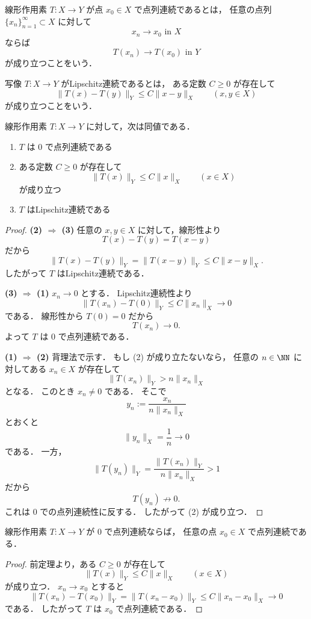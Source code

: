 \begin{definition}[点列連続]
線形作用素 $T:X\to Y$ が点 $x_0\in X$ で点列連続であるとは，
任意の点列 $\{x_n\}_{n=1}^{\infty}\subset X$ に対して
\[
x_n\to x_0 \text{ in } X
\]
ならば
\[
T(x_n)\to T(x_0) \text{ in } Y
\]
が成り立つことをいう．
\end{definition}

\begin{definition}[Lipschitz連続]
写像 $T:X\to Y$ がLipschitz連続であるとは，
ある定数 $C\ge 0$ が存在して
\[
\|T(x)-T(y)\|_Y\le C\|x-y\|_X
\qquad (x,y\in X)
\]
が成り立つことをいう．
\end{definition}

\begin{theorem}[線形作用素の連続性の判定]
線形作用素 $T:X\to Y$ に対して，次は同値である．
\begin{enumerate}
    \item $T$ は $0$ で点列連続である
    \item ある定数 $C\ge 0$ が存在して
    \[
    \|T(x)\|_Y\le C\|x\|_X
    \qquad (x\in X)
    \]
    が成り立つ
    \item $T$ はLipschitz連続である
\end{enumerate}
\end{theorem}
\begin{proof}
\textbf{(2) $\Rightarrow$ (3)}\quad
任意の $x,y\in X$ に対して，線形性より
\[
T(x)-T(y)=T(x-y)
\]
だから
\[
\|T(x)-T(y)\|_Y
=
\|T(x-y)\|_Y
\le
C\|x-y\|_X.
\]
したがって $T$ はLipschitz連続である．

\textbf{(3) $\Rightarrow$ (1)}\quad
$x_n\to 0$ とする．
Lipschitz連続性より
\[
\|T(x_n)-T(0)\|_Y\le C\|x_n\|_X\to 0
\]
である．
線形性から $T(0)=0$ だから
\[
T(x_n)\to 0.
\]
よって $T$ は $0$ で点列連続である．

\textbf{(1) $\Rightarrow$ (2)}\quad
背理法で示す．
もし (2) が成り立たないなら，
任意の $n\in\NN$ に対してある $x_n\in X$ が存在して
\[
\|T(x_n)\|_Y>n\|x_n\|_X
\]
となる．
このとき $x_n\ne 0$ である．
そこで
\[
y_n:=\frac{x_n}{n\|x_n\|_X}
\]
とおくと
\[
\|y_n\|_X=\frac{1}{n}\to 0
\]
である．
一方，
\[
\|T(y_n)\|_Y
=
\frac{\|T(x_n)\|_Y}{n\|x_n\|_X}
>1
\]
だから
\[
T(y_n)\not\to 0.
\]
これは $0$ での点列連続性に反する．
したがって (2) が成り立つ．
\end{proof}

\begin{corollary}
線形作用素 $T:X\to Y$ が $0$ で点列連続ならば，
任意の点 $x_0\in X$ で点列連続である．
\end{corollary}
\begin{proof}
前定理より，ある $C\ge 0$ が存在して
\[
\|T(x)\|_Y\le C\|x\|_X
\qquad (x\in X)
\]
が成り立つ．
$x_n\to x_0$ とすると
\[
\|T(x_n)-T(x_0)\|_Y
=
\|T(x_n-x_0)\|_Y
\le
C\|x_n-x_0\|_X\to 0
\]
である．
したがって $T$ は $x_0$ で点列連続である．
\end{proof}

